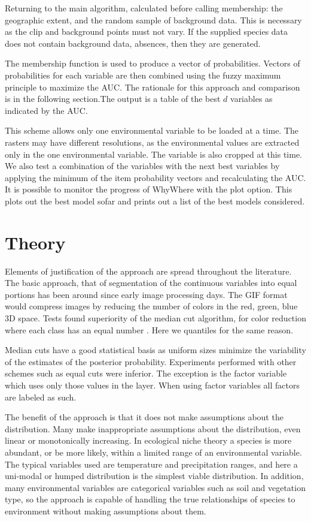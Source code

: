 \documentclass{article}
\newcommand{\pkg}[1]{{\fontseries{b}\selectfont #1}}
\begin{document}
Returning to the main algorithm, calculated before calling membership: the geographic extent, and the random sample of background data.  This is necessary as the clip and background points must not vary.   If the supplied species data does not contain background data,  absences, then they are generated.  

The membership function is used to produce a vector of probabilities.  Vectors of probabilities for each variable are then combined using the fuzzy maximum principle to maximize the AUC.  The rationale for this approach and comparison is in the following section.The output is a table of the best $d$ variables as indicated by the AUC.  

This scheme allows only one environmental variable to be loaded at a time.  The rasters may have different resolutions, as the environmental values are extracted only in the one environmental variable. The variable is also cropped at this time.  We also test a combination of the variables with the next best variables by applying the minimum of the item probability vectors and recalculating the AUC.  It is possible to monitor the progress of \pkg{WhyWhere} with the plot option.  This plots out the best model sofar and prints out a list of the best models considered.



\section{Theory}

Elements of justification of the approach are spread throughout the literature.   The basic approach, that of segmentation of the continuous variables into equal portions has been around since early image processing days.  The GIF format would compress images by reducing the number of colors in the red, green, blue 3D space.  Tests  found superiority of the median cut algorithm, for color reduction where each class has an equal number  \cite{Heckbert82} .  Here we quantiles for the same reason. 

Median cuts have a good statistical basis as uniform sizes minimize the variability of the estimates of the posterior probability.  Experiments performed with other schemes such as equal cuts were inferior.  The exception is the factor variable which uses only those values in the layer.  When using factor variables all factors are labeled as such.

The benefit of the approach is that it does not make assumptions about the distribution.  Many make inappropriate assumptions about the distribution, even linear or monotonically increasing.  In ecological niche theory a species is more abundant, or be more likely,  within a limited range of an environmental variable.  The typical variables used are temperature  and precipitation ranges, and here a uni-modal or humped distribution is the simplest viable distribution.  In addition, many environmental variables are categorical variables such as soil and vegetation type, so the approach is capable of handling the true relationships of species to environment without making assumptions about them.
\end{document}
